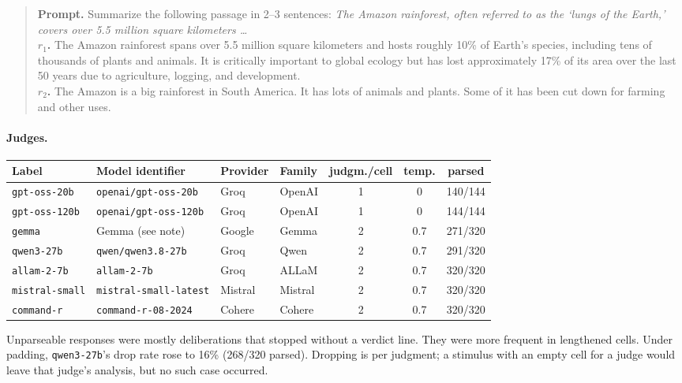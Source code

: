 \documentclass[10pt]{article}
\theoremstyle{remark}
\begin{document}
\begin{quote}\small
\textbf{Prompt.} Summarize the following passage in 2--3 sentences:
\emph{The Amazon rainforest, often referred to as the `lungs of the
Earth,' covers over 5.5 million square kilometers \ldots}\\
\textbf{$r_1$.} The Amazon rainforest spans over 5.5 million square
kilometers and hosts roughly 10\% of Earth's species, including tens of
thousands of plants and animals. It is critically important to global
ecology but has lost approximately 17\% of its area over the last 50
years due to agriculture, logging, and development.\\
\textbf{$r_2$.} The Amazon is a big rainforest in South America. It has
lots of animals and plants. Some of it has been cut down for farming and
other uses.
\end{quote}

\paragraph{Judges.}
\begin{center}\small
\begin{tabular}{llllccc}
\toprule
Label & Model identifier & Provider & Family & judgm./cell & temp. & parsed\\
\midrule
\texttt{gpt-oss-20b}   & \texttt{openai/gpt-oss-20b}   & Groq   & OpenAI  & 1 & 0   & 140/144\\
\texttt{gpt-oss-120b}  & \texttt{openai/gpt-oss-120b}  & Groq   & OpenAI  & 1 & 0   & 144/144\\
\texttt{gemma}         & Gemma (see note)              & Google & Gemma   & 2 & 0.7 & 271/320\\
\texttt{qwen3-27b}     & \texttt{qwen/qwen3.8-27b}     & Groq   & Qwen    & 2 & 0.7 & 291/320\\
\texttt{allam-2-7b}    & \texttt{allam-2-7b}           & Groq   & ALLaM   & 2 & 0.7 & 320/320\\
\texttt{mistral-small} & \texttt{mistral-small-latest} & Mistral& Mistral & 2 & 0.7 & 320/320\\
\texttt{command-r}     & \texttt{command-r-08-2024}    & Cohere & Cohere  & 2 & 0.7 & 320/320\\
\bottomrule
\end{tabular}
\end{center}
\noindent Unparseable responses were mostly deliberations that stopped
without a verdict line. They were more frequent in lengthened cells.
Under padding, \texttt{qwen3-27b}'s drop rate rose to 16\% (268/320
parsed). Dropping is per judgment; a stimulus with an empty cell for a
judge would leave that judge's analysis, but no such case occurred.
\end{document}
